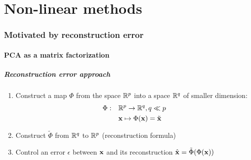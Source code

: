 \documentclass{beamer}\usepackage[]{graphicx}\usepackage[]{color}
\begin{document}
\part{Non-linear methods}
\begin{frame}
  \partpage
\end{frame}

\section{Motivated by reconstruction error}

\subsection{PCA as a matrix factorization}

\begin{frame}
  \frametitle{Reconstruction error approach}

  \begin{enumerate}
    \item  Construct a map $\Phi$ from the space $\mathbb{R}^{p}$ into a space $\mathbb{R}^{q}$ of \alert{smaller dimension}:
      \begin{align*}
      \Phi:\quad & \mathbb{R}^{p} \to \mathbb{R}^{q}, q \ll p\\
               & \mathbf{x} \mapsto \Phi(\mathbf{x}) = \tilde{\mathbf{x}}
      \end{align*}
    \item Construct $\tilde{\Phi}$ from $\mathbb{R}^{q}$ to $\mathbb{R}^{p}$ (\alert{reconstruction formula})
     \item Control an error $\epsilon$ between $\mathbf{x}$ and its reconstruction $\hat {\mathbf{x}} = \tilde{\Phi}(\Phi(\mathbf{x}))$
  \end{enumerate}

\bigskip

\end{frame}
\end{document}

